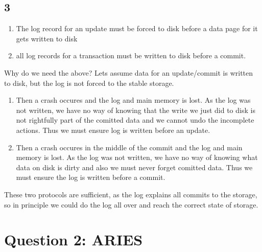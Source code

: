 \documentclass[a4paper, 10pt]{article}
\begin{document}
\subsection*{3}
\begin{enumerate}
    \item The log record for an update must be forced to disk before a data page for it gets written to disk 
    \item all log records for a transaction must be written to disk before a commit.
\end{enumerate}
Why do we need the above?
Lets assume data for an update/commit is written to disk, but the log is not forced to the stable storage.
\begin{enumerate}
    \item Then a crash occures and the log and main memory is lost. As the log was not written, we have no way of knowing that the write we just did to disk is not rightfully part of the comitted data and we cannot undo the incomplete actions. Thus we must ensure log is written before an update.
    \item  Then a crash occures in the middle of the commit and the log and main memory is lost. As the log was not written, we have no way of knowing what data on disk is dirty and also we must never forget comitted data. Thus we must ensure the log is written before a commit.
\end{enumerate}
These two protocols are sufficient, as the log explains all commits to the storage, so in principle we could do the log all over and reach the correct state of storage.

\section*{Question 2: ARIES}
\begin{table}[h!]
\begin{minipage}{0.45\textwidth}

\end{minipage}
\begin{minipage}{0.45\textwidth}

\end{minipage}
\end{table}
\end{document}
